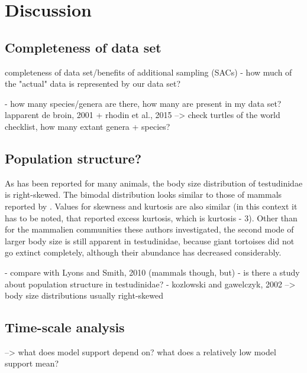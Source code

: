 \section{Discussion}

\subsection{Completeness of data set}

completeness of data set/benefits of additional sampling (SACs)
- how much of the "actual" data is represented by our data set?

- how many species/genera are there, how many are present in my data set?
lapparent de broin, 2001 + rhodin et al., 2015
--> check turtles of the world checklist, how many extant genera + species?


\subsection{Population structure?}

As has been reported for many animals, the body size distribution of testudinidae is right-skewed. 
The bimodal distribution looks similar to those of mammals reported by \cite{Lyons2008}. Values for skewness and kurtosis are also similar  (in this context it has to be noted, that \cite{Lyons2008} reported excess kurtosis, which is kurtosis - 3).
Other than for the mammalien communities these authors investigated, the second mode of larger body size is still apparent in testudinidae, because giant tortoises did not go extinct completely, although their abundance has decreased considerably.

- compare with Lyons and Smith, 2010 (mammals though, but)
- is there a study about population structure in testudinidae?
- kozlowski and gawelczyk, 2002 --> body size distributions usually right-skewed

\subsection{Time-scale analysis}

--> what does model support depend on? what does a relatively low model support mean?




